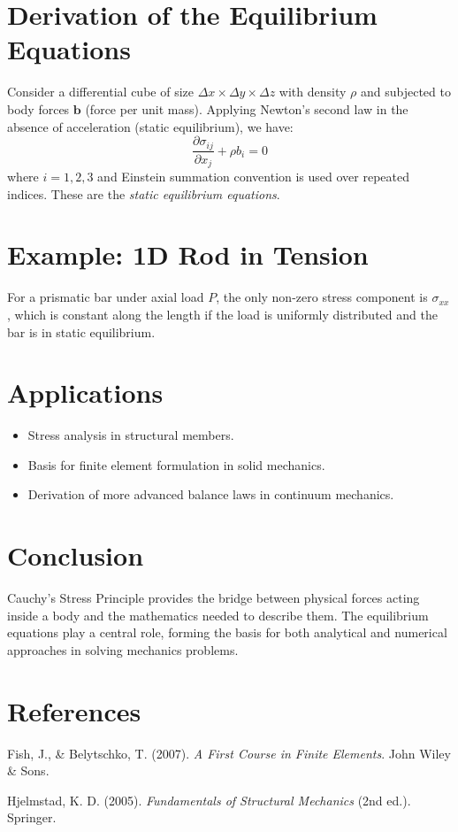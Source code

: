 \documentclass[12pt,a4paper]{article}
\begin{document}
\section{Derivation of the Equilibrium Equations}
Consider a differential cube of size $\Delta x \times \Delta y \times \Delta z$ with density $\rho$ and subjected to body forces $\mathbf{b}$ (force per unit mass). Applying Newton’s second law in the absence of acceleration (static equilibrium), we have:
\begin{equation}
    \frac{\partial \sigma_{ij}}{\partial x_j} + \rho b_i = 0
\end{equation}
where $i = 1,2,3$ and Einstein summation convention is used over repeated indices.  
These are the \textit{static equilibrium equations}.

\section{Example: 1D Rod in Tension}
For a prismatic bar under axial load $P$, the only non-zero stress component is $\sigma_{xx}$, which is constant along the length if the load is uniformly distributed and the bar is in static equilibrium.

\section{Applications}
\begin{itemize}
    \item Stress analysis in structural members.
    \item Basis for finite element formulation in solid mechanics.
    \item Derivation of more advanced balance laws in continuum mechanics.
\end{itemize}

\section{Conclusion}
Cauchy’s Stress Principle provides the bridge between physical forces acting inside a body and the mathematics needed to describe them. The equilibrium equations play a central role, forming the basis for both analytical and numerical approaches in solving mechanics problems.

\section*{References}
\begin{thebibliography}{9}

Fish, J., \& Belytschko, T. (2007). \textit{A First Course in Finite Elements}. John Wiley \& Sons.

Hjelmstad, K. D. (2005). \textit{Fundamentals of Structural Mechanics} (2nd ed.). Springer.

\end{thebibliography}
\end{document}
